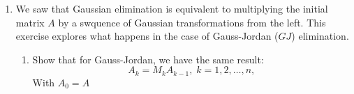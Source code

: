 \documentclass[11pt]{article}
\begin{document}
\begin{enumerate}
	\item We saw that Gaussian elimination is equivalent to multiplying the initial matrix \(A\) by a swquence of Gaussian transformations from the left.  This exercise explores what happens in the case of Gauss-Jordan (\(GJ\)) elimination.
	      \begin{enumerate}
		      \item Show that for Gauss-Jordan, we have the same result:
		            \[A_k = M_kA_{k-1}, \; k = 1, 2, \dots, n,\]
		            With \(A_0 = A\)
	      \end{enumerate}
\end{enumerate}
\end{document}
